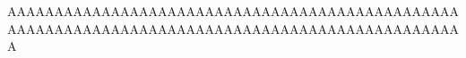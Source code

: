 \newcommand{\associativitypremisepopmapped}{	\crossx{\associativitypremisepoppopmapped}
																									   {\tuple{z_2,z_3}^*Hom} 
                                                     {Ob^4}
																					 }														
\newcommand{\associativitypremisemapped}{\crossx 
                                            {\big(\associativitypremisepopmapped \big)}
																						{\tuple{z_3,z_4}^*Hom} 
																						{Ob^4}  
																				 }

\newcommand{\associativitylhstype}{\isT{{Hom(z_1,z_4)}}}
\newcommand{\associativitylhstypemapped}{\crossx{\Big(\associativitypremisemapped\Big)}
                                        {\tuple{\dddot z_1,\dddot z_4}^*Hom}{Ob^4}}
\newcommand{\associativitylhstermtyping}{\ofT{(f \circ g) \circ h}{Hom(z_1,z_4)}}
\newcommand{\associativityrhstermtyping}{\ofT{f \circ (g \circ h)}{Hom(z_1,z_4)}}	

\newcommand {\assocfogmapped}{\tuple{\dddot z_1,\dddot z_2,\dddot z_3,f,g}^*\fcomp }
\newcommand {\assochmapped}{s(id_{\associativitypremisemapped})}
\newcommand {\assoclhsmapped}{\tuple{z_1,z_3,z_4,\assocfogmapped,\assochmapped}^*\fcomp}

\iffalse AAAAAAAAAAAAAAAAAAAAAAAAAAAAAAAAAAAAAAAAAAAAAAAAAAAAAAAAAAAAAAAAAAAAAAAAAAAAAAAAAAAAAAAAAAAAAAAAA

